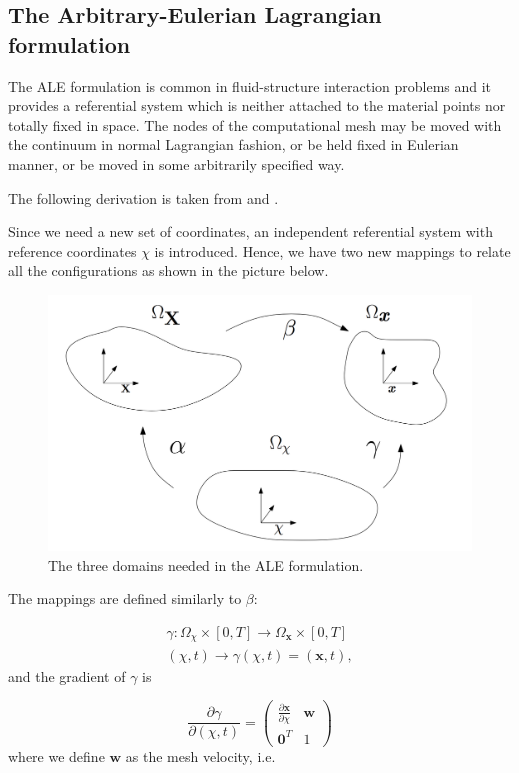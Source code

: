 \documentclass[a4paper,11pt,oneside]{book}
\begin{document}
\subsection{The Arbitrary-Eulerian Lagrangian formulation}
The ALE formulation is common in fluid-structure interaction problems and it provides a referential system which is neither attached to the material points nor totally fixed in space. The nodes of the computational mesh may be moved with the continuum in normal Lagrangian fashion, or be held fixed in Eulerian manner, or be moved in some arbitrarily specified way.

The following derivation is taken from \cite{donea} and \cite{vegard}.

Since we need a new set of coordinates, an independent referential system with reference coordinates $\chi$ is introduced. Hence, we have two new mappings to relate all the configurations as shown in the picture below.

\begin{figure}[h!]
\centering
\includegraphics[width=\textwidth]{images/ALE2}
\caption{The three domains needed in the ALE formulation.}
\end{figure}
The mappings are defined similarly to $\beta$:

\begin{align*}
\gamma : \Omega_{\chi} \times [0, T]  \rightarrow \Omega_\mathbf{x} \times [0, T] \\
(\chi , t)  \rightarrow \gamma(\chi, t) = (\mathbf{x}, t),
\end{align*}
and the gradient of $\gamma$ is 

\begin{equation}
\frac{\partial \gamma}{\partial(\chi, t)} = 
\begin{pmatrix}
\frac{\partial \mathbf{x}}{\partial \chi} & \mathbf{w} \\
\mathbf{0}^T & 1
\end{pmatrix}
\end{equation}
where we define $\mathbf{w}$ as the mesh velocity, i.e.
\end{document}
